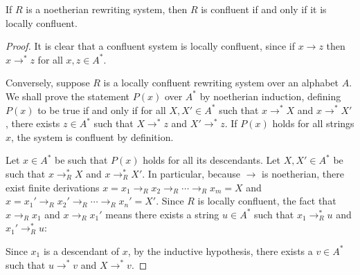 \documentclass[noindex,noinsetproof,emphthm,12pt]{lmaths}
\begin{document}
\begin{theorem}[Newman] \label{thm:newman}
	If $R$ is a noetherian rewriting system, then $R$ is confluent if and only if it is locally confluent.
\end{theorem}
\begin{proof}
	It is clear that a confluent system is locally confluent, since if $x \to z$ then $x \to^* z$ for all $x, z \in A^*$.

	Conversely, suppose $R$ is a locally confluent rewriting system over an alphabet $A$. We shall prove the statement $P(x)$ over $A^*$ by noetherian induction, defining $P(x)$ to be true if and only if for all $X, X' \in A^*$ such that $x \to^* X$ and $x \to^* X'$, there exists $z \in A^*$ such that $X \to^* z$ and $X' \to^* z$. If $P(x)$ holds for all strings $x$, the system is confluent by definition. 

	Let $x \in A^*$ be such that $P(x)$ holds for all its descendants. Let $X, X' \in A^*$ be such that $x \to_R^* X$ and $x \to_R^* X'$. In particular, because $\to$ is noetherian, there exist finite derivations $x = x_1 \to_R x_2 \to_R \cdots \to_R x_m = X$ and $x = x_1' \to_R x_2' \to_R \cdots \to_R x_n' = X'$. Since $R$ is locally confluent, the fact that $x \to_R x_1$ and $x \to_R x_1'$ means there exists a string $u \in A^*$ such that $x_1 \to_R^* u$ and $x_1' \to_R^* u$:

	{\centering
	\par}

	Since $x_1$ is a descendant of $x$, by the inductive hypothesis, there exists a $v \in A^*$ such that $u \to^* v$ and $X \to^* v$.

	{\centering
	\par}


\end{proof}
\end{document}
